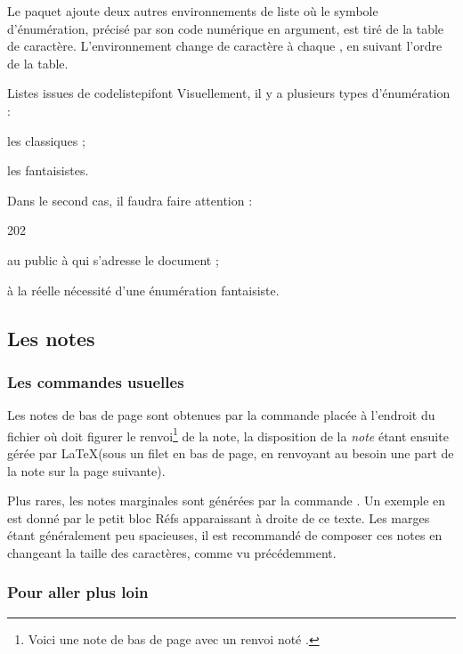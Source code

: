 \label{listepifont}
Le paquet  ajoute deux autres environnements de liste où le symbole d'énumération, précisé par son code numérique en argument, est tiré de la table de caractère. L'environnement  change de caractère à chaque , en suivant l'ordre de la table.

\begin{codedouble}{Listes issues de }{codelistepifont}
Visuellement, il y a plusieurs types d'énumération :
\begin{dinglist}{70}
\item les classiques ;
\item les fantaisistes. 
\end{dinglist}
Dans le second cas, il faudra faire attention :
\begin{dingautolist}{202}
\item au public à qui s'adresse le document ;
\item à la réelle nécessité d'une énumération fantaisiste.
\end{dingautolist}
\end{codedouble}

\subsection{Les notes}  

\subsubsection{Les  commandes usuelles}

Les notes de bas de page sont obtenues par la  commande  placée à l'endroit du fichier  où doit figurer le renvoi\footnote{Voici une note de bas de page avec un renvoi noté \thefootnote.} de la note, la disposition de la \textit{note} étant ensuite gérée par \LaTeX (sous un filet en bas de page, en renvoyant au besoin une part de la note sur la page suivante).

Plus rares, les notes marginales sont générées par la  commande . Un exemple en est donné par le petit bloc \og {}\sffamily Réfs \rmfamily \fg apparaissant à droite de ce texte. Les marges étant généralement peu spacieuses, il est recommandé de composer ces notes en changeant la taille des caractères, comme vu précédemment.

\subsubsection{Pour aller plus loin}

